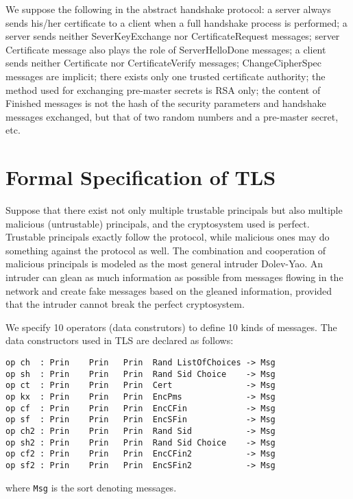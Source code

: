 \documentclass[a4paper,fleqn]{cas-dc}
\begin{document}
We suppose the following in the abstract handshake protocol: a server always sends his/her certificate to a client when a full handshake process is performed; a server sends neither SeverKeyExchange nor CertificateRequest messages; server Certificate message also plays the role of ServerHelloDone messages; a client sends neither Certificate nor CertificateVerify messages; ChangeCipherSpec messages are implicit; there exists only one trusted certificate authority; the method used for exchanging pre-master secrets is RSA only; the content of Finished messages is not the hash of the security parameters and handshake messages exchanged, but that of two random numbers and a pre-master secret, etc.

\section{Formal Specification of TLS} \label{fstls}
Suppose that there exist not only multiple trustable
principals but also multiple malicious (untrustable) principals, and the cryptosystem used is perfect. Trustable
principals exactly follow the protocol, while malicious ones may do something against the protocol as well. The combination and cooperation of malicious principals is modeled as the most general intruder Dolev-Yao\cite{dolev}. 
An intruder can glean as much information as possible from messages flowing in the network and create fake messages based on the gleaned information, provided that the intruder cannot break the perfect cryptosystem.

We specify 10 operators (data construtors) to define 10 kinds of messages. The data constructors used in TLS are declared as follows:
\begin{small}
		\begin{verbatim}
op ch  : Prin    Prin   Prin  Rand ListOfChoices -> Msg
op sh  : Prin    Prin   Prin  Rand Sid Choice    -> Msg
op ct  : Prin    Prin   Prin  Cert               -> Msg
op kx  : Prin    Prin   Prin  EncPms             -> Msg
op cf  : Prin    Prin   Prin  EncCFin            -> Msg
op sf  : Prin    Prin   Prin  EncSFin            -> Msg
op ch2 : Prin    Prin   Prin  Rand Sid           -> Msg
op sh2 : Prin    Prin   Prin  Rand Sid Choice    -> Msg
op cf2 : Prin    Prin   Prin  EncCFin2           -> Msg
op sf2 : Prin    Prin   Prin  EncSFin2           -> Msg
		\end{verbatim}
	\end{small}
where \verb!Msg! is the sort denoting messages. 
\end{document}
